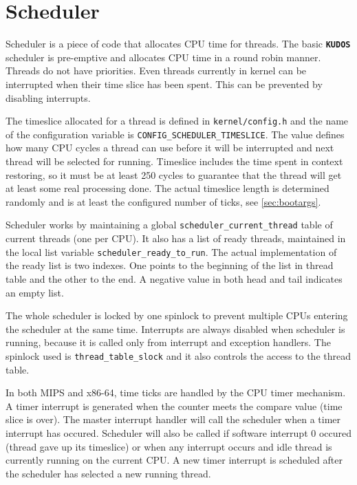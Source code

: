\documentclass[twoside,a4paper]{report}
\newcommand{\kudos}{\texttt{\textbf{KUDOS}}}
\begin{document}
\section{Scheduler}
\label{sec:scheduler}


Scheduler is a piece of code that allocates CPU time for threads. The
basic \kudos{} scheduler is pre-emptive and allocates CPU time in a
round robin manner. Threads do not have priorities. Even threads
currently in kernel can be interrupted when their time slice has been
spent. This can be prevented by disabling interrupts.


The timeslice allocated for a thread is defined in
\texttt{kernel/config.h} and the name of the configuration variable is
\texttt{CONFIG\_SCHEDULER\_TIMESLICE}. The value defines how many CPU
cycles a thread can use before it will be interrupted and next thread
will be selected for running. Timeslice includes the time spent in
context restoring, so it must be at least 250 cycles to guarantee that
the thread will get at least some real processing done. The actual
timeslice length is determined randomly and is at least the configured
number of ticks, see \autoref{sec:bootargs}.

Scheduler works by maintaining a global
\texttt{scheduler\_current\_thread} table of current threads (one per
CPU). It also has a list of ready threads, maintained in the local list
variable \texttt{scheduler\_ready\_to\_run}. The actual implementation
of the ready list is two indexes. One points to the beginning of the list in
thread table and the other to the end. A negative value in both head and
tail indicates an empty list.

The whole scheduler is locked by one spinlock to prevent multiple CPUs
entering the scheduler at the same time. Interrupts are always disabled
when scheduler is running, because it is called only from interrupt
and exception handlers. The spinlock used is
\texttt{thread\_table\_slock} and it also controls the access to the
thread table.

In both MIPS and x86-64, time ticks are handled by the CPU timer mechanism. A timer
interrupt is generated when the counter meets the compare value (time slice
is over). The master interrupt handler will call the scheduler when a timer
interrupt has occured. Scheduler will also be called if software
interrupt 0 occured (thread gave up its timeslice) or when any
interrupt occurs and idle thread is currently running on the current CPU.
A new timer interrupt is scheduled after the scheduler has selected a new
running thread.
\end{document}
